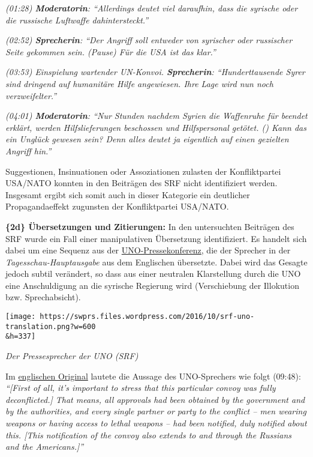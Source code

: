 \emph{(01:28) \textbf{Moderatorin}: ``Allerdings deutet viel daraufhin,
dass die syrische oder die russische Luftwaffe dahintersteckt.''}

\emph{(02:52) \textbf{Sprecherin}: ``Der Angriff soll entweder von
syrischer oder russischer Seite gekommen sein. (Pause) Für die USA ist
das klar.''}

\emph{(03:53) Einspielung wartender UN-Konvoi. \textbf{Sprecherin}:
``Hunderttausende Syrer sind dringend auf humanitäre Hilfe angewiesen.
Ihre Lage wird nun noch verzweifelter.''}

\emph{(04:01) \textbf{Moderatorin}: ``Nur Stunden nachdem Syrien die
Waffenruhe für beendet erklärt, werden Hilfslieferungen beschossen und
Hilfspersonal getötet. () Kann das ein Unglück gewesen sein? Denn alles
deutet ja eigentlich auf einen gezielten Angriff hin.''}

Suggestionen, Insinuationen oder Assoziationen zulasten der
Konfliktpartei USA/NATO konnten in den Beiträgen des SRF nicht
identifiziert werden. Insgesamt ergibt sich somit auch in dieser
Kategorie ein deutlicher Propagandaeffekt zugunsten der Konfliktpartei
USA/NATO.

\textbf{\{2d\} Übersetzungen und Zitierungen:} In den untersuchten
Beiträgen des SRF wurde ein Fall einer manipulativen Übersetzung
identifiziert. Es handelt sich dabei um eine Sequenz aus der
\href{http://webtv.un.org/media/geneva-press-briefings/watch/geneva-press-briefing-hrc-ifrc-ocha-who-iom-unhcr-ohchr-ilo-gavi/5131061146001}{UNO-Pressekonferenz},
die der Sprecher in der \emph{Tagesschau-Hauptausgabe} aus dem
Englischen übersetzte. Dabei wird das Gesagte jedoch subtil verändert,
so dass aus einer neutralen Klarstellung durch die UNO eine
Anschuldigung an die syrische Regierung wird (Verschiebung der
Illokution bzw. Sprechabsicht).

\texttt{[image: https://swprs.files.wordpress.com/2016/10/srf-uno-translation.png?w=600\\\&h=337]}

\emph{Der Pressesprecher der UNO (SRF)}

Im
\href{http://webtv.un.org/media/geneva-press-briefings/watch/geneva-press-briefing-hrc-ifrc-ocha-who-iom-unhcr-ohchr-ilo-gavi/5131061146001}{englischen
Original} lautete die Aussage des UNO-Sprechers wie folgt (09:48):
\emph{``{[}First of all, it's important to stress that this particular
convoy was fully deconflicted.{]} That means, all approvals had been
obtained by the government and by the authorities, and every single
partner or party to the conflict -- men wearing weapons or having access
to lethal weapons -- had been notified, duly notified about this.
{[}This notification of the convoy also extends to and through the
Russians and the Americans.{]}''}

